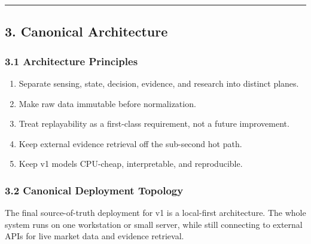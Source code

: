 \documentclass[
]{article}
\providecommand{\tightlist}{%
  \setlength{\itemsep}{0pt}\setlength{\parskip}{0pt}}
\begin{document}
\begin{center}\rule{0.5\linewidth}{0.5pt}\end{center}

\subsection{3. Canonical Architecture}\label{3-canonical-architecture}

\subsubsection{3.1 Architecture
Principles}\label{31-architecture-principles}

\begin{enumerate}
\def\labelenumi{\arabic{enumi}.}
\tightlist
\item
  Separate sensing, state, decision, evidence, and research into
  distinct planes.
\item
  Make raw data immutable before normalization.
\item
  Treat replayability as a first-class requirement, not a future
  improvement.
\item
  Keep external evidence retrieval off the sub-second hot path.
\item
  Keep v1 models CPU-cheap, interpretable, and reproducible.
\end{enumerate}

\subsubsection{3.2 Canonical Deployment
Topology}\label{32-canonical-deployment-topology}

The final source-of-truth deployment for v1 is a local-first
architecture. The whole system runs on one workstation or small server,
while still connecting to external APIs for live market data and
evidence retrieval.
\end{document}
